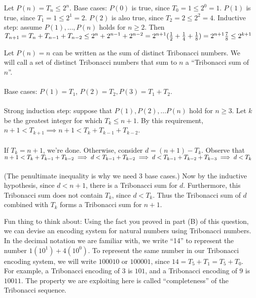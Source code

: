 \documentclass[solution, letterpaper]{cs20}
\begin{document}
\begin{solution}
\subsolution 
Let $P(n) = T_n \le 2^n$. Base cases: $P(0)$ is true, since $T_0 = 1 \le 2^0 = 1$. $P(1)$ is true, since $T_1 = 1 \le 2^1 = 2$. $P(2)$ is also true, since $T_2 = 2 \le 2^2 = 4$. Inductive step: assume $P(1), ..., P(n)$ holds for $n \ge 2$. Then 
\begin{math}
T_{n+1} = T_n + T_{n-1} + T_{n-2}
\\ \le 2^n + 2^{n-1} + 2^{n-2}
\\ = 2^{n+1}(\frac{1}{2} + \frac{1}{4} + \frac{1}{8})
\\ = 2^{n+1}\frac{7}{8}
\\ \le 2^{k+1}
\end{math}

\subsolution
Let $P(n) = n$ can be written as the sum of distinct Tribonacci numbers. We will call a set of distinct Tribonacci numbers that sum to $n$ a ``Tribonacci sum of $n$''. 
\\\\
Base cases: $P(1) = T_1$, $P(2) = T_2, P(3) = T_1 + T_2$. 
\\\\
Strong induction step: suppose that $P(1), P(2), ... P(n)$ hold for $n \ge 3$. Let $k$ be the greatest integer for which $T_k \le n+1$. By this requirement, $n+1 < T_{k+1} \implies n+1 < T_k + T_{k-1} + T_{k-2}$. 
\\\\If $T_k = n+1$, we're done. Otherwise, consider $d = (n+1)-T_k$. Observe that 
\begin{math}
n+1 < T_k + T_{k-1} + T_{k-2} 
\\ \implies d < T_{k-1} + T_{k-2}
\\ \implies d < T_{k-1} + T_{k-2} + T_{k-3} 
\\ \implies d < T_k
\end{math}
\\\\(The penultimate inequality is why we need 3 base cases.)  Now by the inductive hypothesis, since $d < n+1$, there is a Tribonacci sum for $d$. Furthermore, this Tribonacci sum does not contain $T_k$, since $d < T_k$. Thus the Tribonacci sum of $d$ combined with $T_k$ forms a Tribonacci sum for $n+1$.
\end{solution}

Fun thing to think about: Using the fact you proved in part (B) of this question, we can devise an encoding system for natural numbers using Tribonacci numbers. In the decimal notation we are familiar with, we write ``14'' to represent the number $1(10^1) + 4(10^0)$. To represent the same number in our Tribonacci encoding system, we will write $100010$ or $100001$, since $14 = T_5 + T_1 = T_5 + T_0$. For example, a Tribonacci encoding of $3$ is $101$, and a Tribonacci encoding of $9$ is $10011$. The property we are exploiting here is called ``completeness'' of the Tribonacci sequence.
\end{document}
